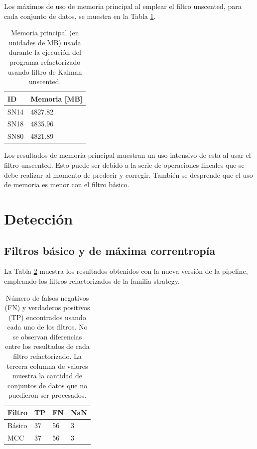 Los m\'aximos de uso de memoria principal al emplear el filtro unscented, para cada conjunto de datos, se muestra en la Tabla \ref{tab:mem5}.

\begin{table}[h!]
\centering
\caption{Memoria principal (en unidades de MB) usada durante la ejecuci\'on del programa refactorizado usando filtro de Kalman unscented.}
\begin{tabular}{|l|l|}
\hline
\textbf{ID} & Memoria [MB]\\\hline\hline
SN14 & 4827.82\\\hline
SN18 & 4835.96\\\hline
SN80 & 4821.89\\\hline
\end{tabular}
\label{tab:mem5}
\end{table}

Los resultados de memoria principal muestran un uso intensivo de esta al usar el filtro unscented. Esto puede ser debido a la serie de operaciones lineales que se debe realizar al momento de predecir y corregir. Tambi\'en se desprende que el uso de memoria es menor con el filtro b\'asico.
\bigskip
 
\section{Detecci\'on}
\subsection{Filtros b\'asico y de m\'axima correntrop\'ia}
La Tabla \ref{tab:tpfn_new} muestra los resultados obtenidos con la nueva versi\'on de la pipeline, empleando los filtros refactorizados de la familia strategy.
\begin{table}[h!]
\centering
\caption{N\'umero de falsos negativos (FN) y verdaderos positivos (TP) encontrados usando cada uno de los filtros. No se observan diferencias entre los resultados de cada filtro refactorizado. La tercera columna de valores muestra la cantidad de conjuntos de datos que no puedieron ser procesados.}
\begin{tabular}{|l|l|l|l|}
\hline
\textbf{Filtro} & \textbf{TP} & \textbf{FN} & \textbf{NaN}\\ \hline
Básico          & 37          & 56          &  3 \\ \hline
MCC             & 37          & 56          & 3 \\ \hline
\end{tabular}
\label{tab:tpfn_new}
\end{table}
\bigskip

